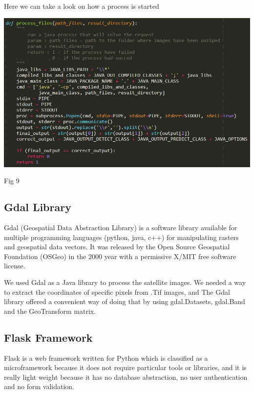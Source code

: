 \documentclass[12pt, a4paper]{report}
\begin{document}
\newpage

Here we can take a look on how a process is started
\par
\medskip
\includegraphics[scale=0.7, center]{python_call_java_2.png}
\begin{center}
Fig 9
\end{center}

\subsection{Gdal Library}

\quad
Gdal (Geospatial Data Abstraction Library) is a software library available for multiple programming languages (python, java, c++) for manipulating rasters and geospatial data vectors. It was released by the Open Source Geospatial Foundation (OSGeo) in the 2000 year with a permissive X/MIT free software license\cite{Gdal}. 
\par 

We used Gdal as a Java library to process the satellite images. We needed a way to extract the coordinates of specific pixels from .Tif images, and The Gdal library offered a convenient way of doing that by using gdal.Datasets, gdal.Band and the GeoTransform matrix.

\subsection{Flask Framework}

\quad
Flask is a web framework written for Python which is classified as a microframework because it does not require particular tools or libraries, and it is really light weight because it has no database abstraction, no user authentication and no form validation.
\par 
\end{document}
